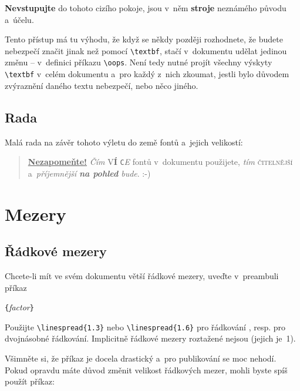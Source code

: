 \begin{example}
\newcommand{\oops}[1]{%
 \textbf{#1}}
\oops{Nevstupujte} do tohoto
cizího pokoje, jsou v~něm
\oops{stroje} neznámého
původu a~účelu.
\end{example}

Tento přístup má tu výhodu, že když se někdy později rozhodnete,
že budete nebezpečí značit jinak než pomocí \verb|\textbf|, stačí
v~dokumentu udělat jedinou změnu -- v~definici příkazu \verb|\oops|.
Není tedy nutné projít všechny výskyty \verb|\textbf| v~celém
dokumentu a~pro každý z~nich zkoumat, jestli bylo důvodem zvýraznění
daného textu nebezpečí, nebo něco jiného.

\subsection{Rada}

Malá rada na závěr tohoto výletu do země fontů a~jejich velikostí:\nopagebreak

\begin{quote}
  \underline{\textbf{Nezapomeňte\Huge!}} \textit{Čím}
  \textsf{V\textbf{\LARGE Í} \texttt{C}\textsl{E}} fontů v~\Huge dokumentu
  \tiny použijete,
  \large \textit{tím} \textsc{čitelnější}
a~\textsl{\textsf{příjemnější} \textbf{na pohled} b\large u\Large d\LARGE e}. :-)
\end{quote}

\section{Mezery}
 
\subsection{Řádkové mezery}

 Chcete-li mít ve svém dokumentu větší řádkové mezery,
uveďte v~preambuli příkaz
\begin{lscommand}
\verb|{|\emph{factor}\verb|}|
\end{lscommand}
Použijte \verb|\linespread{1.3}| nebo \verb|\linespread{1.6}| pro řádkování ,
resp. pro dvojnásobné řádkování.
Implicitně řádkové mezery roztažené nejsou (jejich  je~1).

Všimněte si, že příkaz  je docela drastický a~pro publikování
se moc nehodí. Pokud opravdu máte důvod změnit velikost řádkových mezer,
mohli byste spíš použít příkaz:

